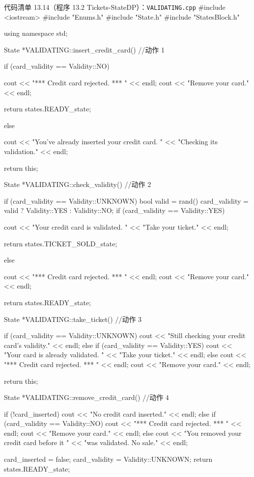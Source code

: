 \begin{codeboxt}{代码清单 13.14（程序 13.2 Tickets-StateDP）：\texttt{VALIDATING.\allowbreak{}cpp}}
#include <iostream>
#include "Enums.h"
#include "State.h"
#include "StatesBlock.h"

using namespace std;

State *VALIDATING::insert_credit_card()  //动作 1
{
    if (card_validity == Validity::NO)
    {
        cout << "*** Credit card rejected. *** " << endl;
        cout << "Remove your card." << endl;

        return states.READY_state;
    }
    else
    {
        cout << "You’ve already inserted your credit card. "
             << "Checking its validation." << endl;

        return this;
    }
}

State *VALIDATING::check_validity()  //动作 2
{
    if (card_validity == Validity::UNKNOWN)
    {
        bool valid = rand()%
        card_validity = valid ? Validity::YES : Validity::NO;
    }
    if (card_validity == Validity::YES)
    {
        cout << "Your credit card is validated. "
             << "Take your ticket." << endl;

        return states.TICKET_SOLD_state;
    }
    else
    {
        cout << "*** Credit card rejected. *** " << endl;
        cout << "Remove your card." << endl;

        return states.READY_state;
    }
}

State *VALIDATING::take_ticket()  //动作 3
{
    if (card_validity == Validity::UNKNOWN)
    {
        cout << "Still checking your credit card’s validity."
             << endl;
    }
    else if (card_validity == Validity::YES)
    {
        cout << "Your card is already validated. "
             << "Take your ticket." << endl;
    }
    else
    {
        cout << "*** Credit card rejected. *** " << endl;
        cout << "Remove your card." << endl;
    }

    return this;
}

State *VALIDATING::remove_credit_card()  //动作 4
{
    if (!card_inserted)
    {
        cout << "No credit card inserted." << endl;
    }
    else if (card_validity == Validity::NO)
    {
        cout << "*** Credit card rejected. *** " << endl;
        cout << "Remove your card." << endl;
    }
    else
    {
        cout << "You removed your credit card before it "
             << "was validated. No sale." << endl;
    }

    card_inserted = false;
    card_validity = Validity::UNKNOWN;
    return states.READY_state;
}
\end{codeboxt}

